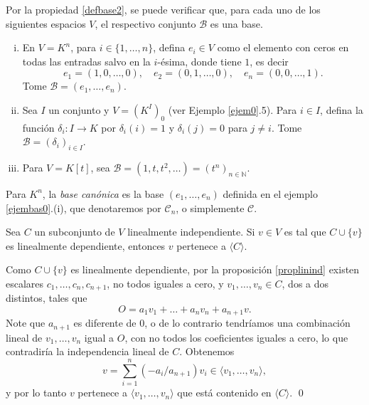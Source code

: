 \begin{ejem}\label{ejembas0}
Por la propiedad \ref{defbase2}, se puede verificar que, para cada uno de los siguientes espacios $V$, el respectivo conjunto $\mathcal{B}$ es una base.
\begin{enumerate}[(i)]
\item En $V=K^n$, para $i\in\{1,\ldots, n\}$, defina $e_i\in V$ como el elemento con ceros en todas las entradas salvo en la $i$-\'esima, donde tiene $1$, es decir
$$e_1=(1,0,\ldots,0),\quad e_2=(0,1,\ldots,0),\quad e_n=(0,0,\ldots,1).$$
Tome $\mathcal{B}=(e_1,\ldots,e_n)$.
\item Sea $I$ un conjunto y $V=\left(K^I\right)_0$ (ver Ejemplo \ref{ejem0}.5). Para $i\in I$, defina la funci\'on $\delta_i: I\rightarrow K$ por $\delta_i(i)=1$ y $\delta_i(j)=0$ para $j\ne i$. Tome $\mathcal{B}=(\delta_i)_{i\in I}$. 
\item Para $V=K[t]$, sea $\mathcal{B}=(1,t,t^2,\ldots)=(t^n)_{n\in\mathbb{N}}$.
\end{enumerate}
\end{ejem}

\begin{nota}
Para $K^n$, la \emph{base can\'onica} es la base $(e_1,\ldots,e_n)$ definida en el ejemplo \ref{ejembas0}.(i), que denotaremos por $\mathcal{C}_n$, o simplemente $\mathcal{C}$.
\end{nota}

\begin{lema}\label{inddep}
Sea $C$ un subconjunto de $V$ linealmente independiente. Si $v\in V$ es tal que $C\cup\{v\}$ es linealmente dependiente, entonces $v$ pertenece a $\langle C\rangle$.
\end{lema}

\dem Como $C\cup\{v\}$ es linealmente dependiente, por la proposici\'on \ref{proplinind} existen escalares $c_1,\ldots,c_n,c_{n+1}$, no todos iguales a cero, y $v_1,\ldots,v_n\in C$, dos a dos distintos, tales que
\[
O=a_1v_1+\ldots+a_nv_n+a_{n+1}v.
\]
Note que $a_{n+1}$ es diferente de $0$, o de lo contrario tendr\'iamos una combinaci\'on lineal de $v_1,\ldots,v_n$ igual a $O$, con no todos los coeficientes iguales a cero, lo que contradiría la independencia lineal de $C$. Obtenemos
\[
v=\sum_{i=1}^n(-a_i/a_{n+1})v_i\in\langle v_1,\ldots,v_n\rangle,
\]
y por lo tanto $v$ pertenece a $\langle v_1,\ldots,v_n\rangle$ que está contenido en $\langle C\rangle$. \qed


